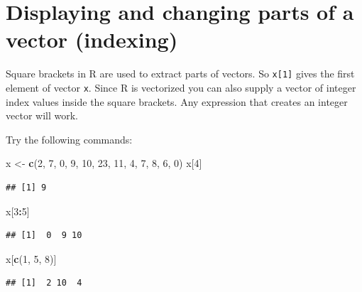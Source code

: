 \documentclass[
]{book}
\newenvironment{Shaded}{\begin{snugshade}}{\end{snugshade}}
\newcommand{\DecValTok}[1]{\textcolor[rgb]{0.00,0.00,0.81}{#1}}
\newcommand{\FunctionTok}[1]{\textcolor[rgb]{0.13,0.29,0.53}{\textbf{#1}}}
\newcommand{\NormalTok}[1]{#1}
\newcommand{\OtherTok}[1]{\textcolor[rgb]{0.56,0.35,0.01}{#1}}
\newcommand{\SpecialCharTok}[1]{\textcolor[rgb]{0.81,0.36,0.00}{\textbf{#1}}}
\begin{document}
\section{Displaying and changing parts of a vector (indexing)}\label{displaying-and-changing-parts-of-a-vector-indexing}

Square brackets in R are used to extract parts of vectors. So
\texttt{x{[}1{]}} gives the first element of vector \texttt{x}. Since R is
vectorized you can also supply a vector of integer index values inside
the square brackets. Any expression that creates an integer vector
will work.

Try the following commands:

\begin{Shaded}
\begin{Highlighting}[]
\NormalTok{x }\OtherTok{\textless{}{-}} \FunctionTok{c}\NormalTok{(}\DecValTok{2}\NormalTok{, }\DecValTok{7}\NormalTok{, }\DecValTok{0}\NormalTok{, }\DecValTok{9}\NormalTok{, }\DecValTok{10}\NormalTok{, }\DecValTok{23}\NormalTok{, }\DecValTok{11}\NormalTok{, }\DecValTok{4}\NormalTok{, }\DecValTok{7}\NormalTok{, }\DecValTok{8}\NormalTok{, }\DecValTok{6}\NormalTok{, }\DecValTok{0}\NormalTok{)}
\NormalTok{x[}\DecValTok{4}\NormalTok{]}
\end{Highlighting}
\end{Shaded}

\begin{verbatim}
## [1] 9
\end{verbatim}

\begin{Shaded}
\begin{Highlighting}[]
\NormalTok{x[}\DecValTok{3}\SpecialCharTok{:}\DecValTok{5}\NormalTok{]}
\end{Highlighting}
\end{Shaded}

\begin{verbatim}
## [1]  0  9 10
\end{verbatim}

\begin{Shaded}
\begin{Highlighting}[]
\NormalTok{x[}\FunctionTok{c}\NormalTok{(}\DecValTok{1}\NormalTok{, }\DecValTok{5}\NormalTok{, }\DecValTok{8}\NormalTok{)]}
\end{Highlighting}
\end{Shaded}

\begin{verbatim}
## [1]  2 10  4
\end{verbatim}
\end{document}
